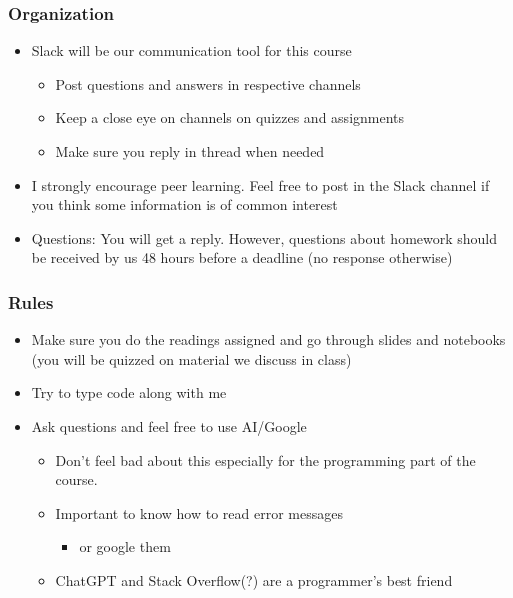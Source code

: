 \documentclass[compress, aspectratio=54]{beamer}
\begin{document}
\begin{frame}
\frametitle{Organization}
\begin{itemize}
\item Slack will be our communication tool for this course
\begin{itemize}
\item Post questions and answers in respective channels
\item Keep a close eye on channels on quizzes and assignments
\item Make sure you reply in thread when needed
\end{itemize}
\item  I strongly encourage peer learning. Feel free to post in the Slack channel if you think some information is of common interest
\item Questions: You will get a reply. However, questions about homework should be received by us 48 hours before a deadline (no response otherwise)
\end{itemize}
\end{frame}


\begin{frame}
\frametitle{Rules}
\begin{itemize}
\item Make sure you do the readings assigned and go through slides and notebooks (you will be quizzed on material we discuss in class)

\item Try to type code along with me 
\item Ask questions and feel free to use AI/Google
\begin{itemize}
\item Don't feel bad about this especially for the programming part of the course. 
\item Important to know how to read error messages
\begin{itemize}

\item or google them
\end{itemize}
\item ChatGPT and Stack Overflow(?)  are a programmer's best friend
\end{itemize}
\end{itemize}
\end{frame}
\end{document}
